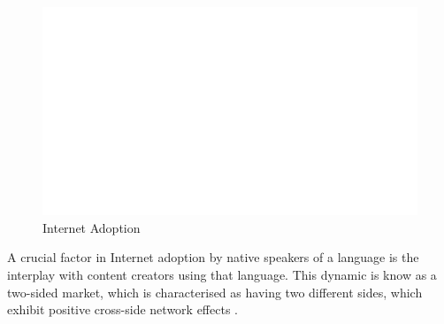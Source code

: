 \documentclass[a4paper,british]{article}\usepackage[]{graphicx}\usepackage[]{color}
\makeatletter
\def\maxwidth{ %
  \ifdim\Gin@nat@width>\linewidth
    \linewidth
  \else
    \Gin@nat@width
  \fi
}
\newenvironment{kframe}{%
 \def\at@end@of@kframe{}%
 \ifinner\ifhmode%
  \def\at@end@of@kframe{\end{minipage}}%
  \begin{minipage}{\columnwidth}%
 \fi\fi%
 \def\FrameCommand##1{\hskip\@totalleftmargin \hskip-\fboxsep
 \colorbox{shadecolor}{##1}\hskip-\fboxsep
     \hskip-\linewidth \hskip-\@totalleftmargin \hskip\columnwidth}%
 \MakeFramed {\advance\hsize-\width
   \@totalleftmargin\z@ \linewidth\hsize
   \@setminipage}}%
 {\par\unskip\endMakeFramed%
 \at@end@of@kframe}
\newenvironment{knitrout}{}{} %
\makeatother
\begin{document}
\begin{figure}[h]
\caption{Internet Adoption}

\begin{centering}
\label{fig:adoption_growth}
\par\end{centering}
\begin{knitrout}
\color{fgcolor}\begin{kframe}


{\ttfamily\noindent\bfseries\color{errorcolor}{\#\# Error in readChar(con, 5L, useBytes = TRUE): cannot open the connection}}\end{kframe}
\end{knitrout}

\begin{knitrout}
\color{fgcolor}\begin{kframe}


{\ttfamily\noindent\bfseries\color{errorcolor}{\#\# Error in readChar(con, 5L, useBytes = TRUE): cannot open the connection}}

{\ttfamily\noindent\bfseries\color{errorcolor}{\#\# Error in if (is.waive(data) || empty(data)) return(cbind(data, PANEL = integer(0))): missing value where TRUE/FALSE needed}}\end{kframe}
\includegraphics[width=\maxwidth]{../Making-Next-Billion-Demand-Access/misc/latex-mobile_growth-1} 

\end{knitrout}
\end{figure}

A crucial factor in Internet adoption by native speakers of a language
is the interplay with content creators using that language. This dynamic
is know as a two-sided market, which is characterised as having two
different sides, which exhibit positive cross-side network effects
\citep{parker2000information,parker2000internetwork,parker2005two}.
\end{document}
